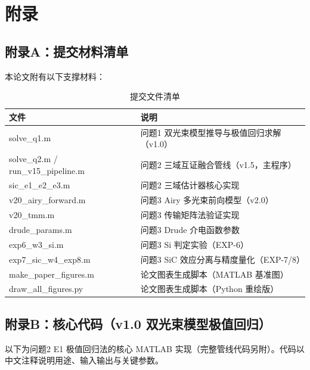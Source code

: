 \makeatletter
\let\@oldaddcontentsline\addcontentsline
\renewcommand{\addcontentsline}[3]{}
\section*{附录}
\let\addcontentsline\@oldaddcontentsline
\makeatother

\subsection*{附录A：提交材料清单}

本论文附有以下支撑材料：

\begin{table}[H]
  \centering
  \caption{提交文件清单}
  \label{tab:appendix_files}
  \renewcommand{\arraystretch}{1.2}
  \begin{tabularx}{\textwidth}{LX}
    \toprule
    文件 & 说明 \\
    \midrule
    solve\_q1.m & 问题1 双光束模型推导与极值回归求解（v1.0）\\
    solve\_q2.m / run\_v15\_pipeline.m & 问题2 三域互证融合管线（v1.5，主程序）\\
    sic\_e1\_e2\_e3.m & 问题2 三域估计器核心实现 \\
    v20\_airy\_forward.m & 问题3 Airy 多光束前向模型（v2.0）\\
    v20\_tmm.m & 问题3 传输矩阵法验证实现 \\
    drude\_params.m & 问题3 Drude 介电函数参数 \\
    exp6\_w3\_si.m & 问题3 Si 判定实验（EXP-6）\\
    exp7\_sic\_w4\_exp8.m & 问题3 SiC 效应分离与精度量化（EXP-7/8）\\
    make\_paper\_figures.m & 论文图表生成脚本（MATLAB 基准图）\\
    draw\_all\_figures.py & 论文图表生成脚本（Python 重绘版）\\
    \bottomrule
  \end{tabularx}
\end{table}

\subsection*{附录B：核心代码（v1.0 双光束模型极值回归）}

以下为问题2 E1 极值回归法的核心 MATLAB 实现（完整管线代码另附）。代码以中文注释说明用途、输入输出与关键参数。

